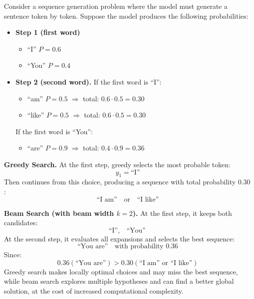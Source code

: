 \begin{examplebox}
    Consider a sequence generation problem where the model must generate a sentence token by token. Suppose the model produces the following probabilities:
    \begin{itemize}
        \item \textbf{Step 1 (first word)}
        \begin{itemize}
            \item ``I'' \quad $P = 0.6$
            \item ``You'' \quad $P = 0.4$
        \end{itemize}
        
        
        \item \textbf{Step 2 (second word).} If the first word is ``I'':
        \begin{itemize}
            \item ``am'' \quad $P = 0.5$ \quad $\Rightarrow$ total: $0.6 \cdot 0.5 = 0.30$
            \item ``like'' \quad $P = 0.5$ \quad $\Rightarrow$ total: $0.6 \cdot 0.5 = 0.30$
        \end{itemize}
        If the first word is ``You'':
        \begin{itemize}
            \item ``are'' \quad $P = 0.9$ \quad $\Rightarrow$ total: $0.4 \cdot 0.9 = 0.36$
        \end{itemize}
    \end{itemize}
    \textbf{Greedy Search.} At the first step, greedy selects the most probable token:
    \begin{equation*}
        y_1 = \text{``I''}
    \end{equation*}
    Then continues from this choice, producing a sequence with total probability $0.30$:
    \begin{equation*}
        \text{``I am''} \quad \text{or} \quad \text{``I like''}
    \end{equation*}

    \highspace
    \textbf{Beam Search (with beam width $k=2$).} At the first step, it keeps both candidates:
    \begin{equation*}
        \text{``I''}, \quad \text{``You''}
    \end{equation*}
    At the second step, it evaluates all expansions and selects the best sequence:
    \begin{equation*}
        \text{``You are''} \quad \text{with probability } 0.36
    \end{equation*}
    Since:
    \begin{equation*}
        0.36 (\text{``You are''}) > 0.30 (\text{``I am''  or ``I like''})
    \end{equation*}
    Greedy search makes locally optimal choices and may miss the best sequence, while beam search explores multiple hypotheses and can find a better global solution, at the cost of increased computational complexity.
\end{examplebox}